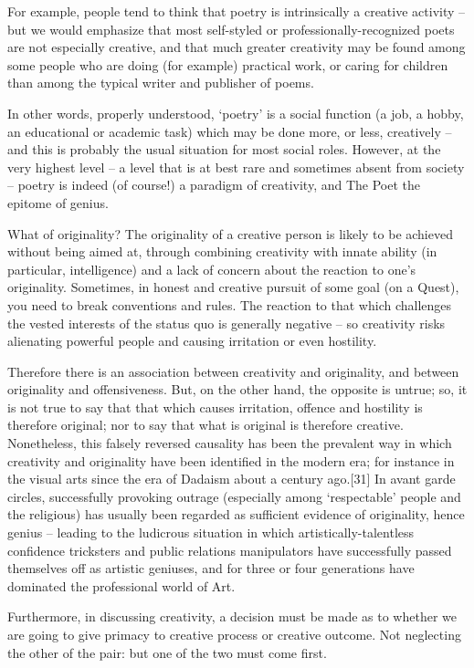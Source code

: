 \documentclass[
]{book}
\begin{document}
For example, people tend to think that poetry is intrinsically a creative activity -- but we would emphasize that most self-styled or professionally-recognized poets are not especially creative, and that much greater creativity may be found among some people who are doing (for example) practical work, or caring for children than among the typical writer and publisher of poems.

In other words, properly understood, `poetry' is a social function (a job, a hobby, an educational or academic task) which may be done more, or less, creatively -- and this is probably the usual situation for most social roles. However, at the very highest level -- a level that is at best rare and sometimes absent from society -- poetry is indeed (of course!) a paradigm of creativity, and The Poet the epitome of genius.

What of originality? The originality of a creative person is likely to be achieved without being aimed at, through combining creativity with innate ability (in particular, intelligence) and a lack of concern about the reaction to one's originality. Sometimes, in honest and creative pursuit of some goal (on a Quest), you need to break conventions and rules. The reaction to that which challenges the vested interests of the status quo is generally negative -- so creativity risks alienating powerful people and causing irritation or even hostility.

Therefore there is an association between creativity and originality, and between originality and offensiveness. But, on the other hand, the opposite is untrue; so, it is not true to say that that which causes irritation, offence and hostility is therefore original; nor to say that what is original is therefore creative.
Nonetheless, this falsely reversed causality has been the prevalent way in which creativity and originality have been identified in the modern era; for instance in the visual arts since the era of Dadaism about a century ago.{[}31{]} In avant garde circles, successfully provoking outrage (especially among `respectable' people and the religious) has usually been regarded as sufficient evidence of originality, hence genius -- leading to the ludicrous situation in which artistically-talentless confidence tricksters and public relations manipulators have successfully passed themselves off as artistic geniuses, and for three or four generations have dominated the professional world of Art.

Furthermore, in discussing creativity, a decision must be made as to whether we are going to give primacy to creative process or creative outcome. Not neglecting the other of the pair: but one of the two must come first.
\end{document}
